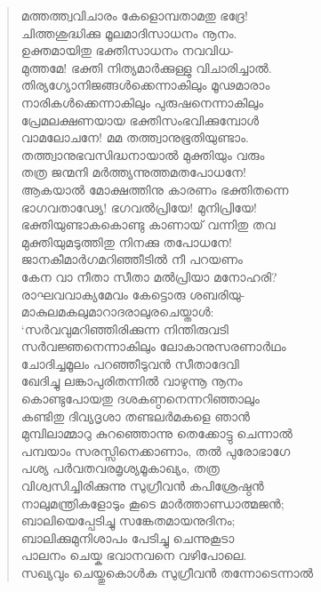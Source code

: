 \begin{verse}
മത്തത്ത്വവിചാരം കേളൊമ്പതാമതു ഭദ്രേ!\\
ചിത്തശുദ്ധിക്കു മൂലമാദിസാധനം നൂനം.\\
ഉക്തമായിതു ഭക്തിസാധനം നവവിധ-\\
മുത്തമേ! ഭക്തി നിത്യമാര്‍ക്കുള്ളു വിചാരിച്ചാല്‍.\\
തിര്യഗ്യോനിജങ്ങള്‍ക്കെന്നാകിലും മൂഢമാരാം\\
നാരികള്‍ക്കെന്നാകിലും പുരുഷനെന്നാകിലും\\
പ്രേമലക്ഷണയായ ഭക്തിസംഭവിക്കുമ്പോള്‍\\
വാമലോചനേ! മമ തത്ത്വാനുഭൂതിയുണ്ടാം.\\
തത്ത്വാനുഭവസിദ്ധനായാല്‍ മുക്തിയും വരും\\
തത്ര ജന്മനി മര്‍ത്ത്യന്നുത്തമതപോധനേ!\\
ആകയാല്‍ മോക്ഷത്തിനു കാരണം ഭക്തിതന്നെ\\
ഭാഗവതാഢ്യേ! ഭഗവല്‍പ്രിയേ! മുനിപ്രിയേ!\\
ഭക്തിയുണ്ടാകകൊണ്ടു കാണായ് വന്നിതു തവ\\
മുക്തിയുമടുത്തിതു നിനക്കു തപോധനേ!\\
ജാനകീമാര്‍ഗമറിഞ്ഞീടില്‍ നീ പറയണം\\
കേന വാ നീതാ സീതാ മല്‍പ്രിയാ മനോഹരി?\\
രാഘവവാക്യമേവം കേട്ടൊരു ശബരിയു-\\
മാകുലമകലുമാറാദരാലുരചെയ്താള്‍:\\
‘സര്‍വവുമറിഞ്ഞിരിക്കുന്ന നിന്തിരുവടി\\
സര്‍വജ്ഞനെന്നാകിലും ലോകാനുസരണാര്‍ഥം\\
ചോദിച്ചമൂലം പറഞ്ഞീടുവന്‍ സീതാദേവി\\
ഖേദിച്ചു ലങ്കാപുരിതന്നില്‍ വാഴുന്നൂ നൂനം\\
കൊണ്ടുപോയതു ദശകണ്ഠനെന്നറിഞ്ഞാലും\\
കണ്ടിതു ദിവ്യദൃശാ തണ്ടലര്‍മകളെ ഞാന്‍\\
മുമ്പിലാമ്മാറു കുറഞ്ഞൊന്നു തെക്കോട്ടു ചെന്നാല്‍\\
പമ്പയാം സരസ്സിനെക്കാണാം, തല്‍ പുരോഭാഗേ\\
പശ്യ പര്‍വതവരമൃശ്യമൂകാഖ്യം, തത്ര\\
വിശ്വസിച്ചിരിക്കുന്നു സുഗ്രീവന്‍ കപിശ്രേഷ്ഠന്‍\\
നാലുമന്ത്രികളോടും കൂടെ മാര്‍ത്താണ്ഡാത്മജന്‍;\\
ബാലിയെപ്പേടിച്ചു സങ്കേതമായനുദിനം;\\
ബാലിക്കുമുനിശാപം പേടിച്ചു ചെന്നുകൂടാ\\
പാലനം ചെയ്ക ഭവാനവനെ വഴിപോലെ.\\
സഖ്യവും ചെയ്തുകൊള്‍ക സുഗ്രീവന്‍ തന്നോടെന്നാല്‍\\

\end{verse}

